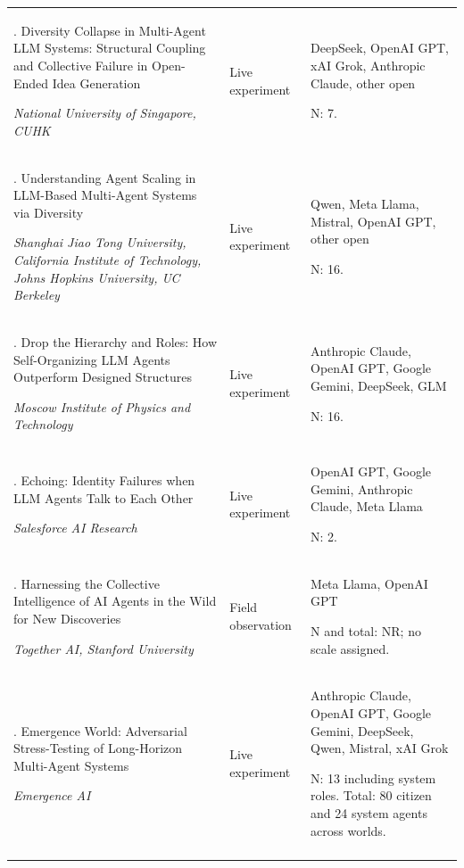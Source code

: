 \begin{longtable}{@{}>{\raggedright\arraybackslash}p{}>{\raggedright\arraybackslash}p{}>{\raggedright\arraybackslash}p{}@{}}
72. Diversity Collapse in Multi-Agent LLM Systems: Structural Coupling and Collective Failure in Open-Ended Idea Generation \citep{diversity-collapse}\par\emph{National University of Singapore, CUHK} & Live experiment & DeepSeek, OpenAI GPT, xAI Grok, Anthropic Claude, other open\par N: 7. \\ \addlinespace[2pt]
73. Understanding Agent Scaling in LLM-Based Multi-Agent Systems via Diversity \citep{diversity-scaling}\par\emph{Shanghai Jiao Tong University, California Institute of Technology, Johns Hopkins University, UC Berkeley} & Live experiment & Qwen, Meta Llama, Mistral, OpenAI GPT, other open\par N: 16. \\ \addlinespace[2pt]
74. Drop the Hierarchy and Roles: How Self-Organizing LLM Agents Outperform Designed Structures \citep{dochkina-drop-hierarchy}\par\emph{Moscow Institute of Physics and Technology} & Live experiment & Anthropic Claude, OpenAI GPT, Google Gemini, DeepSeek, GLM\par N: 16. \\ \addlinespace[2pt]
75. Echoing: Identity Failures when LLM Agents Talk to Each Other \citep{echoing-identity-failures}\par\emph{Salesforce AI Research} & Live experiment & OpenAI GPT, Google Gemini, Anthropic Claude, Meta Llama\par N: 2. \\ \addlinespace[2pt]
76. Harnessing the Collective Intelligence of AI Agents in the Wild for New Discoveries \citep{einsteinarena}\par\emph{Together AI, Stanford University} & Field observation & Meta Llama, OpenAI GPT\par N and total: NR; no scale assigned. \\ \addlinespace[2pt]
77. Emergence World: Adversarial Stress-Testing of Long-Horizon Multi-Agent Systems \citep{emergence-world}\par\emph{Emergence AI} & Live experiment & Anthropic Claude, OpenAI GPT, Google Gemini, DeepSeek, Qwen, Mistral, xAI Grok\par N: 13 including system roles. Total: 80 citizen and 24 system agents across worlds. \\ \addlinespace[2pt]

\end{longtable}

